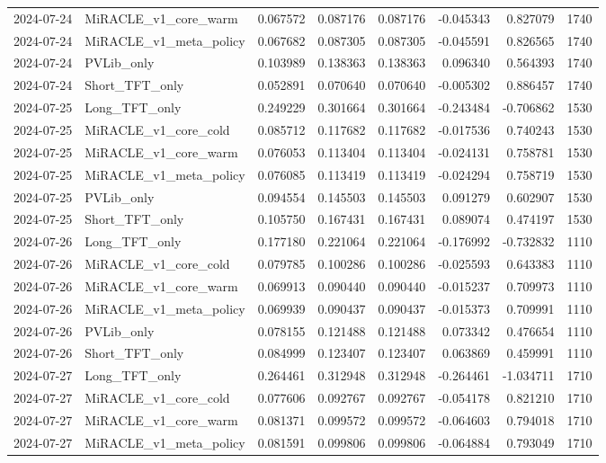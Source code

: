 \begin{tabular}{llrrrrrr}
2024-07-24 & MiRACLE_v1_core_warm & 0.067572 & 0.087176 & 0.087176 & -0.045343 & 0.827079 & 1740 \\
2024-07-24 & MiRACLE_v1_meta_policy & 0.067682 & 0.087305 & 0.087305 & -0.045591 & 0.826565 & 1740 \\
2024-07-24 & PVLib_only & 0.103989 & 0.138363 & 0.138363 & 0.096340 & 0.564393 & 1740 \\
2024-07-24 & Short_TFT_only & 0.052891 & 0.070640 & 0.070640 & -0.005302 & 0.886457 & 1740 \\
2024-07-25 & Long_TFT_only & 0.249229 & 0.301664 & 0.301664 & -0.243484 & -0.706862 & 1530 \\
2024-07-25 & MiRACLE_v1_core_cold & 0.085712 & 0.117682 & 0.117682 & -0.017536 & 0.740243 & 1530 \\
2024-07-25 & MiRACLE_v1_core_warm & 0.076053 & 0.113404 & 0.113404 & -0.024131 & 0.758781 & 1530 \\
2024-07-25 & MiRACLE_v1_meta_policy & 0.076085 & 0.113419 & 0.113419 & -0.024294 & 0.758719 & 1530 \\
2024-07-25 & PVLib_only & 0.094554 & 0.145503 & 0.145503 & 0.091279 & 0.602907 & 1530 \\
2024-07-25 & Short_TFT_only & 0.105750 & 0.167431 & 0.167431 & 0.089074 & 0.474197 & 1530 \\
2024-07-26 & Long_TFT_only & 0.177180 & 0.221064 & 0.221064 & -0.176992 & -0.732832 & 1110 \\
2024-07-26 & MiRACLE_v1_core_cold & 0.079785 & 0.100286 & 0.100286 & -0.025593 & 0.643383 & 1110 \\
2024-07-26 & MiRACLE_v1_core_warm & 0.069913 & 0.090440 & 0.090440 & -0.015237 & 0.709973 & 1110 \\
2024-07-26 & MiRACLE_v1_meta_policy & 0.069939 & 0.090437 & 0.090437 & -0.015373 & 0.709991 & 1110 \\
2024-07-26 & PVLib_only & 0.078155 & 0.121488 & 0.121488 & 0.073342 & 0.476654 & 1110 \\
2024-07-26 & Short_TFT_only & 0.084999 & 0.123407 & 0.123407 & 0.063869 & 0.459991 & 1110 \\
2024-07-27 & Long_TFT_only & 0.264461 & 0.312948 & 0.312948 & -0.264461 & -1.034711 & 1710 \\
2024-07-27 & MiRACLE_v1_core_cold & 0.077606 & 0.092767 & 0.092767 & -0.054178 & 0.821210 & 1710 \\
2024-07-27 & MiRACLE_v1_core_warm & 0.081371 & 0.099572 & 0.099572 & -0.064603 & 0.794018 & 1710 \\
2024-07-27 & MiRACLE_v1_meta_policy & 0.081591 & 0.099806 & 0.099806 & -0.064884 & 0.793049 & 1710 \\

\end{tabular}
